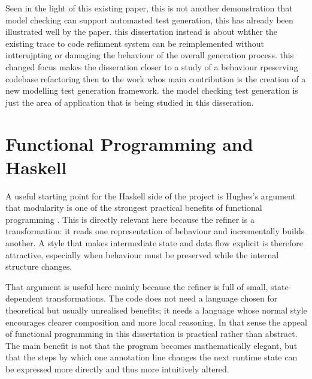 Seen in the light of this existing paper, this is not another demonstration that model checking can support automasted test generation, this has already been illustrated well by the paper. this dissertation instead is about whther the existing trace to code refinment system can be reimplemented without intterujpting or damaging the behaviour of the overall generation process. this changed focus makes the disseration closer to a study of a behaviour rpeserving codebase refactoring then to the work whos main contribution is the creation of a new modelling test generation framework. the model checking test generation is just the area of application that is being studied in this disseration. 

\section{Functional Programming and Haskell}


A useful starting point for the Haskell side of the project is Hughes's argument that modularity is one of the strongest practical benefits of functional programming \citep{hughes1989why}. This is directly relevant here because the refiner is a transformation: it reads one representation of behaviour and incrementally builds another. A style that makes intermediate state and data flow explicit is therefore attractive, especially when behaviour must be preserved while the internal structure changes.

That argument is useful here mainly because the refiner is full of small, state-dependent transformations. The code does not need a language chosen for theoretical but usually unrealised benefits; it needs a language whose normal style encourages clearer composition and more local reasoning. In that sense the appeal of functional programming in this dissertation is practical rather than abstract. The main benefit is not that the program becomes mathematically elegant, but that the steps by which one annotation line changes the next runtime state can be expressed more directly and thus more intuitively altered.

